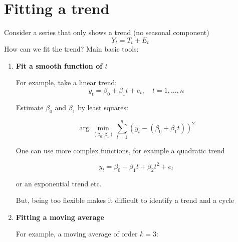 \documentclass[dvipsnames,12pt]{book}
\begin{document}
            \section{Fitting a trend}

                Consider a series that only shows a trend (no seasonal component)
                \[
                Y_t = T_t + E_t
                \]
                \noindent How can we fit the trend? Main basic tools:

                \begin{enumerate}
                    \item \textbf{Fit a smooth function of \(t\)}

                        For example, take a linear trend:
                        \[
                        y_t = \beta_0 + \beta_1 t + e_t, \quad t = 1, \dots, n
                        \]
                        
                        \noindent Estimate \( \beta_0 \) and \( \beta_1 \) by least squares:
                        
                        \begin{equation}
                            \arg\min_{(\beta_0, \beta_1)} \sum_{t=1}^{n} (y_t - (\beta_0 + \beta_1 t))^2
                        \end{equation}
                        
                        \noindent One can use more complex functions, for example a quadratic trend
                        
                        \begin{equation}
                            y_t = \beta_0 + \beta_1 t + \beta_2 t^2 + e_t
                        \end{equation}
                        
                        \noindent or an exponential trend etc.
                        
                        \begin{remark}
                            But, being too flexible makes it difficult to identify a trend and a cycle
                        \end{remark}

\newpage

                    \item \textbf{Fitting a moving average}

                        For example, a moving average of order \( k = 3 \):


\end{enumerate}
\end{document}
